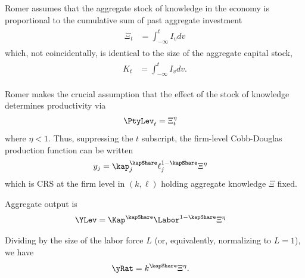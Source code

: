 \documentclass{handout} \usepackage{handoutSetup}\usepackage{handoutShortcuts} %
\begin{document}
Romer assumes that the aggregate stock of knowledge in the economy is
proportional to the cumulative sum of past aggregate investment
\begin{equation}\begin{gathered}\begin{aligned}
  \Xi_{t} & =   \int_{-\infty}^{t} I_v dv 
\end{aligned}\end{gathered}\end{equation}
which, not coincidentally, is identical to the size of the aggregate capital stock,
\begin{equation}\begin{gathered}\begin{aligned}
  K_{t} & =   \int_{-\infty}^{t} I_v dv .
\end{aligned}\end{gathered}\end{equation}

Romer makes the crucial assumption that the effect of the stock of knowledge determines 
productivity via
\begin{equation}\begin{gathered}\begin{aligned}
  \PtyLev_{t} & =  \Xi_{t}^{\eta}
\end{aligned}\end{gathered}\end{equation}
where $\eta < 1$.  Thus, suppressing the $t$ subscript, the firm-level
Cobb-Douglas production function can be written
\begin{equation}\begin{gathered}\begin{aligned}
  y_{j} & =  \kap_{j}^{\kapShare}\ell_{j}^{1-\kapShare}\Xi^{\eta}
\end{aligned}\end{gathered}\end{equation}
which is CRS at the firm level in $(k,\ell)$ holding aggregate knowledge $\Xi$ fixed.

Aggregate output is
\begin{equation}\begin{gathered}\begin{aligned}
  \YLev & =  {\Kap}^\kapShare \Labor^{1-\kapShare} \Xi^{\eta}
\end{aligned}\end{gathered}\end{equation}

Dividing by the size of the labor force $L$ (or, equivalently, normalizing to $L=1$), we have
\begin{equation}\begin{gathered}\begin{aligned}
  \yRat & =  k^{\kapShare}\Xi^{\eta}.
\end{aligned}\end{gathered}\end{equation}
\end{document}
